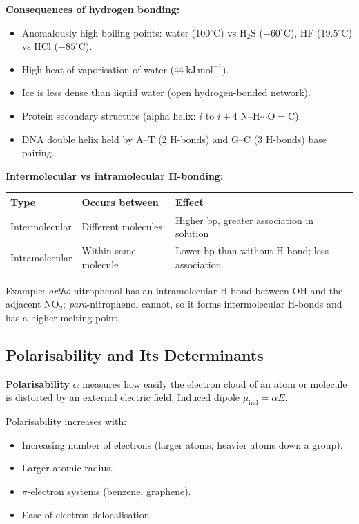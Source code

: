 \documentclass[12pt,a4paper]{article}
\begin{document}
\textbf{Consequences of hydrogen bonding:}
\begin{itemize}[leftmargin=*, itemsep=2pt, topsep=2pt]
  \item Anomalously high boiling points: water (100$^\circ$C) vs $\mathrm{H_2S}$ ($-60^\circ$C), HF (19.5$^\circ$C) vs HCl ($-85^\circ$C).
  \item High heat of vaporisation of water ($44\ \mathrm{kJ\,mol^{-1}}$).
  \item Ice is less dense than liquid water (open hydrogen-bonded network).
  \item Protein secondary structure (alpha helix: $i$ to $i+4$ N--H$\cdots$O$=$C).
  \item DNA double helix held by A--T (2 H-bonds) and G--C (3 H-bonds) base pairing.
\end{itemize}

\textbf{Intermolecular vs intramolecular H-bonding:}\par\noindent
\begin{tabularx}{\linewidth}{|B{3.2cm}|Y|Y|}
\hline
\textbf{Type} & \textbf{Occurs between} & \textbf{Effect} \\
\hline
Intermolecular & Different molecules & Higher bp, greater association in solution \\
\hline
Intramolecular & Within same molecule & Lower bp than without H-bond; less association \\
\hline
\end{tabularx}

Example: \emph{ortho}-nitrophenol has an intramolecular H-bond between OH and the adjacent $\mathrm{NO_2}$; \emph{para}-nitrophenol cannot, so it forms intermolecular H-bonds and has a higher melting point.

\subsection{Polarisability and Its Determinants}

\begin{tcolorbox}[defbox]
\textbf{Polarisability} $\alpha$ measures how easily the electron cloud of an atom or molecule is distorted by an external electric field. Induced dipole $\mu_{\mathrm{ind}} = \alpha E$.
\end{tcolorbox}

Polarisability increases with:
\begin{itemize}[leftmargin=*, itemsep=1pt, topsep=2pt]
  \item Increasing number of electrons (larger atoms, heavier atoms down a group).
  \item Larger atomic radius.
  \item $\pi$-electron systems (benzene, graphene).
  \item Ease of electron delocalisation.
\end{itemize}
\end{document}
